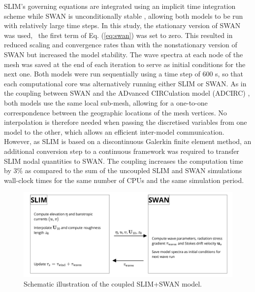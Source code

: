 SLIM's governing equations are integrated using an implicit time integration scheme while SWAN is unconditionally stable \citep{dietrich2012performance}, allowing both models to be run with relatively large time steps. In this study, the stationary version of SWAN was used, \ie~the first term of Eq. (\ref{eq:swan}) was set to zero. This resulted in reduced scaling and convergence rates than with the nonstationary version of SWAN but increased the model stability. The wave spectra at each node of the mesh was saved at the end of each iteration to serve as initial conditions for the next one. Both models were run sequentially using a time step of 600 s, so that each computational core was alternatively running either SLIM or SWAN. As in the coupling between SWAN and the ADvanced CIRCulation model (ADCIRC) \citep{dietrich2012performance}, both models use the same local sub-mesh, allowing for a one-to-one correspondence between the geographic locations of the mesh vertices. No interpolation is therefore needed when passing the discretised variables from one model to the other, which allows an efficient inter-model communication. However, as SLIM is based on  a discontinuous Galerkin finite element method, an additional conversion step to a continuous framework was required to transfer SLIM nodal quantities to SWAN. The coupling increases the computation time by 3\% as compared to the sum of the uncoupled SLIM and SWAN simulations wall-clock times for the same number of CPUs and the same simulation period.


\begin{figure}
    \centering
    \includegraphics[width=.99\textwidth]{chapters/irma/figures/coupling_v2.png}
    \caption{Schematic illustration of the coupled SLIM+SWAN model.}
    \label{fig:coupling}
\end{figure}

